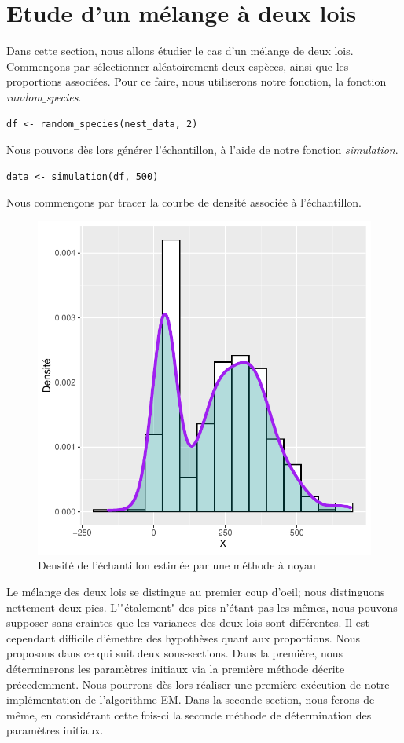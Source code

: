 \documentclass[frenchb]{report}
\newcommand{\1}{\mathbbm{1}}
\theoremstyle{definition}\newtheorem{defn}{Définition}
\theoremstyle{definition}\newtheorem{exm}{Exemple}
\theoremstyle{definition}\newtheorem{nota}{Notation}
\theoremstyle{definition}\newtheorem{rem}{Remarque}
\begin{document}
\section{Etude d'un mélange à deux lois}
Dans cette section, nous allons étudier le cas d'un mélange de deux lois. Commençons par sélectionner aléatoirement deux espèces, ainsi que les proportions associées. Pour ce faire, nous utiliserons notre fonction, la fonction \textit{random$\_$species}. 

\begin{lstlisting}
df <- random_species(nest_data, 2)
\end{lstlisting}

Nous pouvons dès lors générer l'échantillon, à l'aide de notre fonction \textit{simulation}.

\begin{lstlisting}
data <- simulation(df, 500)
\end{lstlisting}

Nous commençons par tracer la courbe de densité associée à l'échantillon.
\begin{figure}[H]
\centering
\includegraphics[scale=0.8]{dens_1.pdf}
\caption{Densité de l'échantillon estimée par une méthode à noyau}
\end{figure}
Le mélange des deux lois se distingue au premier coup d'oeil; nous distinguons nettement deux pics. L'"étalement" des pics n'étant pas les mêmes, nous pouvons supposer sans craintes que les variances des deux lois sont différentes. Il est cependant difficile d'émettre des hypothèses quant aux proportions.\newline
Nous proposons dans ce qui suit deux sous-sections. Dans la première, nous déterminerons les paramètres initiaux via la première méthode décrite précedemment. Nous pourrons dès lors réaliser une première exécution de notre implémentation de l'algorithme EM.
Dans la seconde section, nous ferons de même, en considérant cette fois-ci la seconde méthode de détermination des paramètres initiaux.
\end{document}
